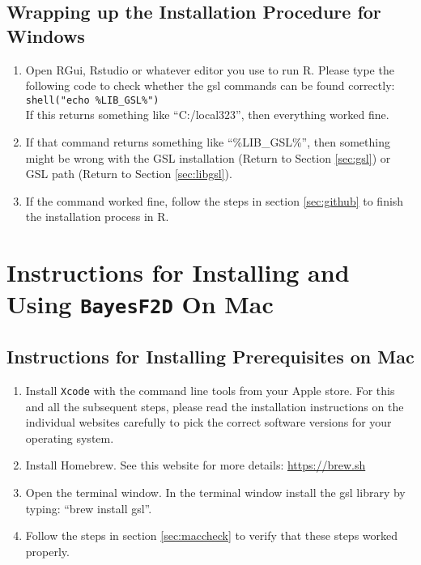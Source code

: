 \documentclass{article}
\begin{document}
\subsection{\Large Wrapping up the Installation Procedure for Windows}
\label{wrapup}
\begin{enumerate}
\item Open RGui, Rstudio or whatever editor you use to run R. Please type the following code to check whether the gsl commands can be found correctly:\\ \texttt{shell("echo \%LIB\_GSL\%")}\\ If this returns something like ``C:/local323'', then everything worked fine.
 \item If that command returns something like ``\%LIB\_GSL\%'', then something might be wrong with the GSL installation (Return to Section \ref{sec:gsl}) or GSL path (Return to Section \ref{sec:libgsl}).
 \item If the command worked fine, follow the steps in section \ref{sec:github} to finish the installation process in R.
\end{enumerate}



\section{\Large Instructions for Installing and Using \texttt{BayesF2D} On Mac}

\subsection{\Large Instructions for Installing Prerequisites on Mac}
\label{sec:macpre}
\begin{enumerate}
\item Install \texttt{Xcode} with the command line tools from your Apple store. For this and all the subsequent steps, please read the installation instructions on the individual websites carefully to pick the correct software versions for your operating system.
\item Install Homebrew. See this website for more details: \url{https://brew.sh}
\item Open the terminal window. In the terminal window install the gsl library by typing: ``brew install gsl''.
\item Follow the steps in section \ref{sec:maccheck} to verify that these steps worked properly.
\end{enumerate}
\end{document}

